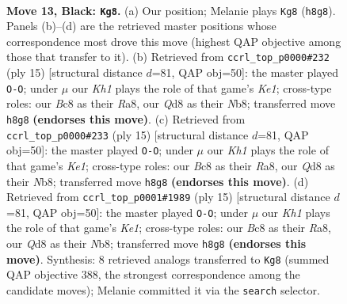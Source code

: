 \documentclass[11pt]{article}
\begin{document}
\clearpage

\begin{figure}[p]\centering
\begin{subfigure}{0.46\textwidth}\centering
\resizebox{\linewidth}{!}{%
\newchessgame
\chessboard[
  setfen={r1bqnr1k/pp1pppbp/8/2p5/2P3Q1/2N5/PP1P1PBP/R1B1NRK1 b - - 0 13},
  showmover=false,
  pgfstyle=straightmove, color=movearrow, markmove={h8-g8}
]}
\caption{}
\end{subfigure}\hfill
\begin{subfigure}{0.46\textwidth}\centering
\resizebox{\linewidth}{!}{%
\newchessgame
\chessboard[
  setfen={rnbqk2r/pp2bppp/5n2/3p4/3Q4/5NP1/PP2PPBP/RNB2RK1 b kq - 3 8},
  showmover=false,
  pgfstyle=straightmove, color=movearrow, markmove={e8-g8}
]}
\caption{}
\end{subfigure}
\\[4pt]
\begin{subfigure}{0.46\textwidth}\centering
\resizebox{\linewidth}{!}{%
\newchessgame
\chessboard[
  setfen={rnbqk2r/pp2bppp/5n2/3p4/3Q4/5NP1/PP2PPBP/RNB2RK1 b kq - 3 8},
  showmover=false,
  pgfstyle=straightmove, color=movearrow, markmove={e8-g8}
]}
\caption{}
\end{subfigure}\hfill
\begin{subfigure}{0.46\textwidth}\centering
\resizebox{\linewidth}{!}{%
\newchessgame
\chessboard[
  setfen={rnbqk2r/pp2bppp/5n2/3p4/3Q4/5NP1/PP2PPBP/RNB2RK1 b kq - 3 8},
  showmover=false,
  pgfstyle=straightmove, color=movearrow, markmove={e8-g8}
]}
\caption{}
\end{subfigure}
\caption{\textbf{Move 13, Black: \texttt{Kg8}.} (a) Our position; Melanie plays \texttt{Kg8} (\texttt{h8g8}). Panels (b)--(d) are the retrieved master positions whose correspondence most drove this move (highest QAP objective among those that transfer to it). (b) Retrieved from \texttt{ccrl\_top\_p0000\#232} (ply 15) [structural distance $d$=81, QAP obj=50]: the master played \texttt{O-O}; under $\mu$ our \emph{Kh1} plays the role of that game's \emph{Ke1}; cross-type roles: our \emph{B}c8 as their \emph{R}a8, our \emph{Q}d8 as their \emph{N}b8; transferred move \texttt{h8g8} \textbf{(endorses this move)}. (c) Retrieved from \texttt{ccrl\_top\_p0000\#233} (ply 15) [structural distance $d$=81, QAP obj=50]: the master played \texttt{O-O}; under $\mu$ our \emph{Kh1} plays the role of that game's \emph{Ke1}; cross-type roles: our \emph{B}c8 as their \emph{R}a8, our \emph{Q}d8 as their \emph{N}b8; transferred move \texttt{h8g8} \textbf{(endorses this move)}. (d) Retrieved from \texttt{ccrl\_top\_p0001\#1989} (ply 15) [structural distance $d$=81, QAP obj=50]: the master played \texttt{O-O}; under $\mu$ our \emph{Kh1} plays the role of that game's \emph{Ke1}; cross-type roles: our \emph{B}c8 as their \emph{R}a8, our \emph{Q}d8 as their \emph{N}b8; transferred move \texttt{h8g8} \textbf{(endorses this move)}. Synthesis: 8 retrieved analogs transferred to \texttt{Kg8} (summed QAP objective 388, the strongest correspondence among the candidate moves); Melanie committed it via the \texttt{search} selector.}
\label{fig:thought-m25}
\end{figure}
\end{document}
